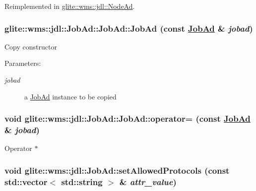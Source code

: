 Reimplemented in \hyperlink{classglite_1_1wms_1_1jdl_1_1NodeAd_b2}{glite::wms::jdl::Node\-Ad}.\hypertarget{classglite_1_1wms_1_1jdl_1_1JobAd_z1_4}{
\subsubsection[JobAd::JobAd]{\setlength{\rightskip}{0pt plus 5cm}glite::wms::jdl::Job\-Ad::Job\-Ad::Job\-Ad (const \hyperlink{classglite_1_1wms_1_1jdl_1_1JobAd}{Job\-Ad} \& {\em jobad})}}
\label{classglite_1_1wms_1_1jdl_1_1JobAd_z1_4}


Copy constructor \begin{Desc}
\item[Parameters:]
\begin{description}
\item[{\em jobad}]a \hyperlink{classglite_1_1wms_1_1jdl_1_1JobAd}{Job\-Ad} instance to be copied \end{description}
\end{Desc}
\hypertarget{classglite_1_1wms_1_1jdl_1_1JobAd_z1_5}{
\subsubsection[JobAd::operator=]{\setlength{\rightskip}{0pt plus 5cm}void glite::wms::jdl::Job\-Ad::Job\-Ad::operator= (const \hyperlink{classglite_1_1wms_1_1jdl_1_1JobAd}{Job\-Ad} \& {\em jobad})}}
\label{classglite_1_1wms_1_1jdl_1_1JobAd_z1_5}


Operator $\ast$ \hypertarget{classglite_1_1wms_1_1jdl_1_1JobAd_z5_2}{
\subsubsection[setAllowedProtocols]{\setlength{\rightskip}{0pt plus 5cm}void glite::wms::jdl::Job\-Ad::set\-Allowed\-Protocols (const std::vector$<$ std::string $>$ \& {\em attr\_\-value})}}
\label{classglite_1_1wms_1_1jdl_1_1JobAd_z5_2}


